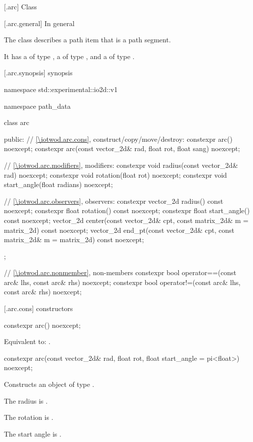  [\iotwod.arc] {Class }

 [\iotwod.arc.general] {In general}

\pnum
{}%
The class  describes a path item that is a path segment.

\pnum
It has a  of type , a  of type , and a  of type .

 [\iotwod.arc.synopsis] { synopsis}

\begin{codeblock}
namespace std::experimental::io2d::v1 {
  namespace path_data {
    class arc {
    public:
      // \ref{\iotwod.arc.cons}, construct/copy/move/destroy:
      constexpr arc() noexcept;
      constexpr arc(const vector_2d& rad,
        float rot, float sang) noexcept;

      // \ref{\iotwod.arc.modifiers}, modifiers:
      constexpr void radius(const vector_2d& rad) noexcept;
      constexpr void rotation(float rot) noexcept;
      constexpr void start_angle(float radians) noexcept;

      // \ref{\iotwod.arc.observers}, observers:
      constexpr vector_2d radius() const noexcept;
      constexpr float rotation() const noexcept;
      constexpr float start_angle() const noexcept;
      vector_2d center(const vector_2d& cpt, const matrix_2d& m = matrix_2d{}) 
        const noexcept;
      vector_2d end_pt(const vector_2d& cpt, const matrix_2d& m = matrix_2d{}) 
        const noexcept;
    };
    
    // \ref{\iotwod.arc.nonmember}, non-members
    constexpr bool operator==(const arc& lhs, const arc& rhs) noexcept;
    constexpr bool operator!=(const arc& lhs, const arc& rhs) noexcept;
  }
}
\end{codeblock}

 [\iotwod.arc.cons] { constructors}

%
\begin{itemdecl}
constexpr arc() noexcept;
\end{itemdecl}
\begin{itemdescr}
\pnum
\effects
Equivalent to: .
\end{itemdescr}

%
\begin{itemdecl}
constexpr arc(const vector_2d& rad, float rot,
  float start_angle = pi<float>) noexcept;
\end{itemdecl}
\begin{itemdescr}
\pnum
\effects
Constructs an object of type .

\pnum
The radius is .

\pnum
The rotation is .

\pnum
The start angle is .
\end{itemdescr}

